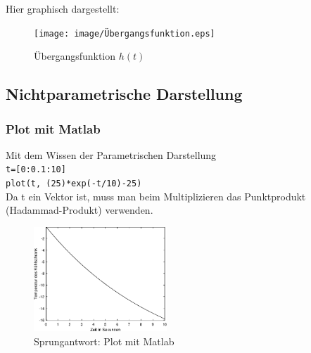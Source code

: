Hier graphisch dargestellt:
\begin{figure}[H]
    \centering
    \texttt{[image: image/Übergangsfunktion.eps]}
    \caption{Übergangsfunktion $h(t)$}
\end{figure}


\subsection{Nichtparametrische Darstellung}
\subsubsection{Plot mit Matlab}

Mit dem Wissen der Parametrischen Darstellung\\ 
\texttt{t=[0:0.1:10]}\\
\texttt{plot(t, (25)*exp(-t/10)-25)}\\
Da t ein Vektor ist, muss man beim Multiplizieren das Punktprodukt (Hadammad-Produkt) verwenden.

        
%
                    
\begin{figure}[H]
    \centering
    \includegraphics[width=5cm]{image/PlotMitMatLab.eps}
    \caption{Sprungantwort: Plot mit Matlab}
\end{figure}
